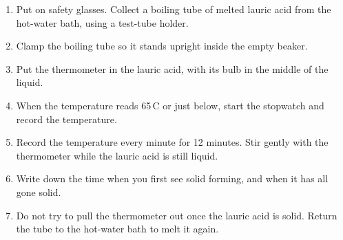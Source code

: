 \begin{center}
\end{center}

\begin{enumerate}[itemsep=2pt]
  \item Put on safety glasses. Collect a boiling tube of melted lauric acid from the hot-water bath, using a test-tube holder.
  \item Clamp the boiling tube so it stands upright inside the empty beaker.
  \item Put the thermometer in the lauric acid, with its bulb in the middle of the liquid.
  \item When the temperature reads 65\,\textdegree C or just below, start the stopwatch and record the temperature.
  \item Record the temperature every minute for 12 minutes. Stir gently with the thermometer while the lauric acid is still liquid.
  \item Write down the time when you first see solid forming, and when it has all gone solid.
  \item Do not try to pull the thermometer out once the lauric acid is solid. Return the tube to the hot-water bath to melt it again.
\end{enumerate}


